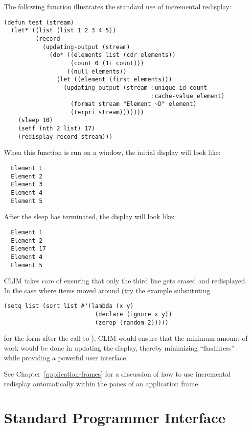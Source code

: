 The following function illustrates the standard use of incremental redisplay:

\begin{verbatim}
(defun test (stream)
  (let* ((list (list 1 2 3 4 5))
         (record
           (updating-output (stream)
             (do* ((elements list (cdr elements))
                   (count 0 (1+ count)))
                  ((null elements))
               (let ((element (first elements)))
                 (updating-output (stream :unique-id count
                                          :cache-value element)
                   (format stream "Element ~D" element)
                   (terpri stream)))))))
    (sleep 10)
    (setf (nth 2 list) 17)
    (redisplay record stream)))
\end{verbatim}

When this function is run on a window, the initial display will look like:

\begin{verbatim}
  Element 1
  Element 2
  Element 3
  Element 4
  Element 5
\end{verbatim}

After the sleep has terminated, the display will look like:

\begin{verbatim}
  Element 1
  Element 2
  Element 17
  Element 4
  Element 5
\end{verbatim}

CLIM takes care of ensuring that only the third line gets erased and
redisplayed.  In the case where items moved around (try the example substituting

\begin{verbatim}
(setq list (sort list #'(lambda (x y)
                          (declare (ignore x y))
                          (zerop (random 2))))) 
\end{verbatim}

for the form after the call to ), CLIM would ensure that the minimum
amount of work would be done in updating the display, thereby minimizing
``flashiness'' while providing a powerful user interface.

See Chapter~\ref{application-frames} for a discussion of how to use incremental
redisplay automatically within the panes of an application frame.


\section {Standard Programmer Interface}

